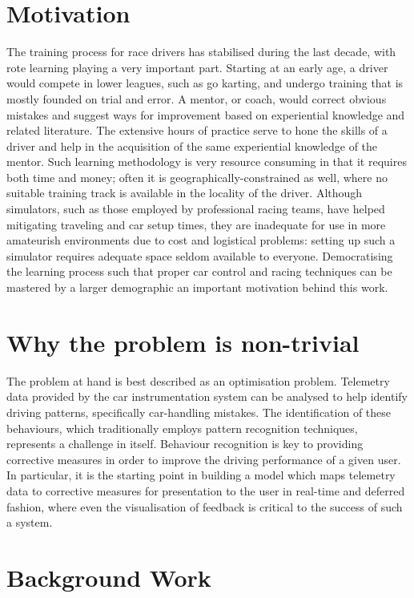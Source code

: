 \documentclass{article}
\begin{document}
\section{Motivation}
The training process for race drivers has stabilised during the last decade, with rote learning playing a very important part. Starting at an early age, a driver would compete in lower leagues, such as go karting, and undergo training that is mostly founded on trial and error. A mentor, or coach, would correct obvious mistakes and suggest ways for improvement based on experiential knowledge and related literature. The extensive hours of practice serve to hone the skills of a driver and help in the acquisition of the same experiential knowledge of the mentor. Such learning methodology is very resource consuming in that it requires both time and money; often it is geographically-constrained as well, where no suitable training track is available in the locality of the driver. Although simulators, such as those employed by professional racing teams, have helped mitigating traveling and car setup times, they are inadequate for use in more amateurish environments due to cost and logistical problems: setting up such a simulator requires adequate space seldom available to everyone. Democratising the learning process such that proper car control and racing techniques can be mastered by a larger demographic an important motivation behind this work.

\section{Why the problem is non-trivial}
The problem at hand is best described as an optimisation problem. Telemetry data provided by the car instrumentation system can be analysed to help identify driving patterns, specifically car-handling mistakes. The identification of these behaviours, which traditionally employs pattern recognition techniques, represents a challenge in itself. Behaviour recognition is key to providing corrective measures in order to improve the driving performance of a given user. In particular, it is the starting point in building a model which maps telemetry data to corrective measures for presentation to the user in real-time and deferred fashion, where even the visualisation of feedback is critical to the success of such a system.

\section{Background Work}
\end{document}

